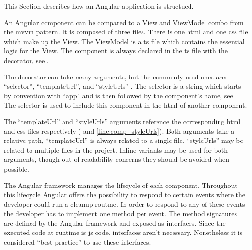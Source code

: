 



This Section describes how an Angular application is structued. 


An Angular component can be compared to a View and ViewModel combo from the \gls{mvvm} pattern. It is composed of three files. There is one \gls{html} and one \gls{css} file which make up the View. The ViewModel is a \gls{ts} file which contains the essential logic for the View. The component is always declared in the \gls{ts} file with the  decorator, see .


The  decorator can take many arguments, but the commonly used ones are: \enquote{selector}, \enquote{templateUrl}, and \enquote{styleUrls} \cite{ngcomponent}. The selector is a string which starts by convention with \enquote{app} and is then followed by the component's name, see . The selector is used to include this component in the \gls{html} of another component.

The \enquote{templateUrl} and \enquote{styleUrls} arguments reference the corresponding \gls{html} and \gls{css} files respectively ( and \ref{line:comp_styleUrls}). Both arguments take a relative path, \enquote{templateUrl} is always related to a single file, \enquote{styleUrls} may be related to multiple files in the project. Inline variants may be used for both arguments, though out of readability concerns they should be avoided when possible.

The Angular framework manages the lifecycle of each component. Throughout this lifecycle Angular offers the possibility to respond to certain events \zB {} where the developer could run a cleanup routine. In order to respond to any of these events the developer has to implement one method per event. The method signatures are defined by the Angular framework and exposed as interfaces. Since the executed code at runtime is \gls{js} code, interfaces aren't necessary. Nonetheless it is considered \enquote{best-practice} to use these interfaces.

